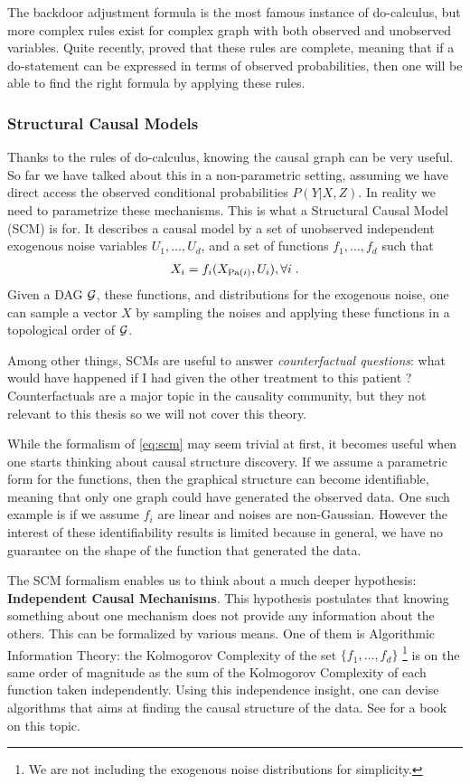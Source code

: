 The backdoor adjustment formula is the most famous instance of do-calculus, but more complex rules exist for complex graph with both observed and unobserved variables. Quite recently, \citet{huang2012pearl} proved that these rules are complete, meaning that if a do-statement can be expressed in terms of observed probabilities, then one will be able to find the right formula by applying these rules. 


\subsubsection{Structural Causal Models}

Thanks to the rules of do-calculus, knowing the causal graph can be very useful. So far we have talked about this in a non-parametric setting, assuming we have direct access the observed conditional probabilities $P(Y|X, Z)$. In reality we need to parametrize these mechanisms. This is what a Structural Causal Model (SCM) is for. It describes a causal model by a set of unobserved independent exogenous noise variables $U_1, \dots, U_d$, and a set of functions $f_1, \dots, f_d$ such that
\begin{align}
    X_i = f_i(X_{\operatorname{\mathrm{Pa}}(i)}, U_i), \forall i \;.
    \label{eq:scm}
\end{align}
Given a DAG ${\mathcal G}$, these functions, and distributions for the exogenous noise, one can sample a vector $X$ by sampling the noises and applying these functions in a topological order of ${\mathcal G}$.

Among other things, SCMs are useful to answer \textit{counterfactual questions}: what would have happened if I had given the other treatment to this patient ?  Counterfactuals are a major topic in the causality community, but they not relevant to this thesis so we will not cover this theory.

While the formalism of \eqref{eq:scm} may seem trivial at first, it becomes useful when one starts thinking about causal structure discovery. 
If we assume a parametric form for the functions, then the graphical structure can become identifiable, meaning that only one graph could have generated the observed data. One such example is if we assume $f_i$ are linear and noises are non-Gaussian. 
However the interest of these identifiability results is limited because in general, we have no guarantee on the shape of the function that generated the data. 

The SCM formalism enables us to think about a much deeper hypothesis: \textbf{Independent Causal Mechanisms}. This hypothesis postulates that knowing something about one mechanism does not provide any information about the others. This can be formalized by various means. One of them is Algorithmic Information Theory: the Kolmogorov Complexity of the set $\{ f_1, \dots, f_d \}$
\footnote{We are not including the exogenous noise distributions for simplicity.}
is on the same order of magnitude as the sum of the Kolmogorov Complexity of each function taken independently. 
Using this independence insight, one can devise algorithms that aims at finding the causal structure of the data. See \citet{peters2017elements} for a book on this topic.

